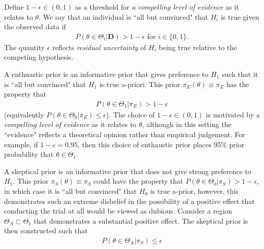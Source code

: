 \documentclass[12pt]{article}
\begin{document}
Define $1-\epsilon\in(0,1)$ as a threshold for \textit{a compelling level of evidence} as it relates to $\theta$. We say that an individual is ``all but convinced" that $H_i$ is true given the observed data if 
\begin{align}
P(\theta\in\Theta_i|\mathbf{D})> 1-\epsilon\text{ for }i\in\{0,1\}.
\end{align}  The quantity $\epsilon$ reflects \textit{residual uncertainty} of $H_i$ being true relative to the competing hypothesis. %


A enthuastic prior is an informative prior that gives preference to $H_1$ such that it is ``all but convinced" that $H_1$ is true a-priori. This prior $\pi_{E}(\theta)\equiv\pi_{E}$ has the property that 
\begin{align}\label{eq:enth_prior}
P(\theta\in\Theta_1| \pi_{E})>1-\epsilon
\end{align} (equivalently $P(\theta\in\Theta_0| \pi_{E})\leq\epsilon$). The choice of $1-\epsilon\in(0,1)$ is motivated by a \textit{compelling level of evidence} as it relates to $\theta$, although in this setting the ``evidence" reflects a theoretical opinion rather than empirical judgement. For example, if $1-\epsilon=0.95$, then this choice of enthaustic prior places 95\% prior probability that $\theta\in\Theta_1$.  

A skeptical prior is an informative prior that does not give strong preference to $H_1$. This prior $\pi_{S}(\theta)\equiv\pi_{S}$ could have the property that $P(\theta\in\Theta_0| \pi_{S})>1-\epsilon$, in which case it is ``all but convinced" that $H_0$ is true a-prior, however, this demonstrates such an extreme disbelief in the possibility of a positive effect that conducting the trial at all would be viewed as dubious. Consider a region $\Theta_A\subset\Theta_1$ that demonstrates a substantial positive effect. The skeptical prior is then constructed such that 
\begin{align}\label{eq:skpt_prior}
P(\theta\in\Theta_A| \pi_{S})\leq\epsilon
\end{align}
\end{document}
